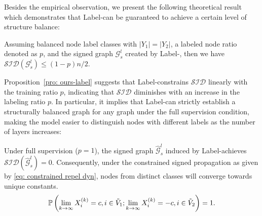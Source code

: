 Besides the empirical observation, we present the following theoretical result which demonstrates that Label-\ours can be guaranteed to achieve a certain level of structure balance:
\begin{proposition}
\label{pro: ours-label}
Assuming balanced node label classes with $|Y_1| = |Y_2|$,  a labeled node ratio denoted as $p$, and the signed graph \(\mathcal{G}_s^l\) created by Label-\ours, 
then we have $\mathcal{SID}(\mathcal{G}_s^l) \leq (1-p)n/2$.
\end{proposition}
Proposition~\ref{pro: ours-label} suggests that Label-\ours constrains $\mathcal{SID}$ linearly with the training ratio $p$, indicating that $\mathcal{SID}$ diminishes with an increase in the labeling ratio $p$. In particular, it implies that Label-\ours can strictly establish a structurally balanced graph for any graph under the full supervision condition, making the model easier to distinguish nodes with different labels as the number of layers increases: 
\begin{theorem}
Under full supervision ($p=1$), the signed graph \(\hat{\mathcal{G}}_s^l\) induced by Label-\ours achieves $\mathcal{SID}(\hat{\mathcal{G}}_s^l)=0$.
Consequently, under the constrained signed propagation as given by \eqref{eq: constrained repel dyn}, nodes from distinct classes will converge towards unique constants.
\begin{equation}
\small
    \mathbb{P}\left(\lim_{k \to \infty} X_i^{(k)} = c, i \in \tilde{V}_1; \lim_{k \to \infty} X_i^{(k)} = -c, i \in \tilde{V}_2 \right) = 1.
    \vspace{-0.5cm}
\end{equation}
\end{theorem}

